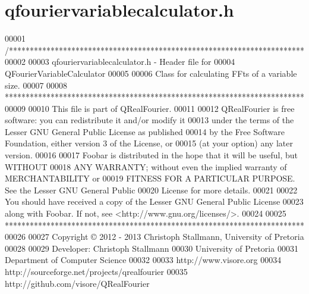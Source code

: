 \hypertarget{a00124_source}{\section{qfouriervariablecalculator.\+h}
\label{a00124_source}
}

\begin{DoxyCode}
00001 \textcolor{comment}{/***********************************************************************}
00002 \textcolor{comment}{}
00003 \textcolor{comment}{qfouriervariablecalculator.h - Header file for}
00004 \textcolor{comment}{                               QFourierVariableCalculator}
00005 \textcolor{comment}{}
00006 \textcolor{comment}{Class for calculating FFts of a variable size.}
00007 \textcolor{comment}{}
00008 \textcolor{comment}{************************************************************************}
00009 \textcolor{comment}{}
00010 \textcolor{comment}{This file is part of QRealFourier.}
00011 \textcolor{comment}{}
00012 \textcolor{comment}{QRealFourier is free software: you can redistribute it and/or modify it}
00013 \textcolor{comment}{under the terms of the Lesser GNU General Public License as published}
00014 \textcolor{comment}{by the Free Software Foundation, either version 3 of the License, or}
00015 \textcolor{comment}{(at your option) any later version.}
00016 \textcolor{comment}{}
00017 \textcolor{comment}{Foobar is distributed in the hope that it will be useful, but WITHOUT}
00018 \textcolor{comment}{ANY WARRANTY; without even the implied warranty of MERCHANTABILITY or}
00019 \textcolor{comment}{FITNESS FOR A PARTICULAR PURPOSE.  See the Lesser GNU General Public}
00020 \textcolor{comment}{License for more details.}
00021 \textcolor{comment}{}
00022 \textcolor{comment}{You should have received a copy of the Lesser GNU General Public License}
00023 \textcolor{comment}{along with Foobar.  If not, see <http://www.gnu.org/licenses/>.}
00024 \textcolor{comment}{}
00025 \textcolor{comment}{************************************************************************}
00026 \textcolor{comment}{}
00027 \textcolor{comment}{Copyright © 2012 - 2013 Christoph Stallmann, University of Pretoria}
00028 \textcolor{comment}{}
00029 \textcolor{comment}{Developer: Christoph Stallmann}
00030 \textcolor{comment}{University of Pretoria}
00031 \textcolor{comment}{Department of Computer Science}
00032 \textcolor{comment}{}
00033 \textcolor{comment}{http://www.visore.org}
00034 \textcolor{comment}{http://sourceforge.net/projects/qrealfourier}
00035 \textcolor{comment}{http://github.com/visore/QRealFourier}

\end{DoxyCode}
